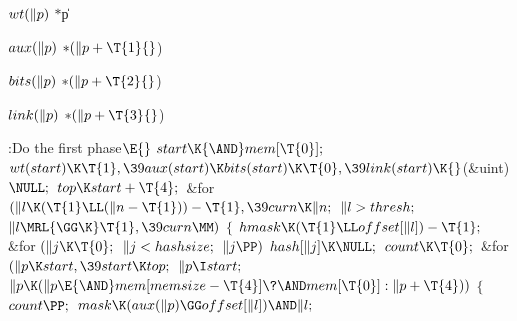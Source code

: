 \Y\B\4\D$\\{wt}(\|p)$ \5
${*}{}$\|p\par
\B\4\D$\\{aux}(\|p)$ \5
${*}(\|p+\T{1}{}$)\par
\B\4\D$\\{bits}(\|p)$ \5
${*}(\|p+\T{2}{}$)\par
\B\4\D$\\{link}(\|p)$ \5
${*}(\|p+\T{3}{}$)\par
\Y\B\4:Do the first phase\X${}\E{}$\6
$\\{start}\K{\AND}\\{mem}[\T{0}];{}$\6
${}\\{wt}(\\{start})\K\T{1},\39\\{aux}(\\{start})\K\\{bits}(\\{start})\K\T{0},%
\39\\{link}(\\{start})\K{}$(\&{uint}) ${}\NULL;{}$\6
${}\\{top}\K\\{start}+\T{4};{}$\6
\&{for} ${}(\|l\K(\T{1}\LL(\|n-\T{1}))-\T{1},\39\\{curn}\K\|n;{}$ ${}\|l>%
\\{thresh};{}$ ${}\|l\MRL{{\GG}{\K}}\T{1},\39\\{curn}\MM){}$\5
${}\{{}$\1\6
${}\\{hmask}\K(\T{1}\LL\\{offset}[\|l])-\T{1};{}$\6
\&{for} ${}(\|j\K\T{0};{}$ ${}\|j<\\{hashsize};{}$ ${}\|j\PP){}$\1\5
${}\\{hash}[\|j]\K\NULL;{}$\2\6
${}\\{count}\K\T{0};{}$\6
\&{for} ${}(\|p\K\\{start},\39\\{start}\K\\{top};{}$ ${}\|p\I\\{start};{}$ ${}%
\|p\K(\|p\E{\AND}\\{mem}[\\{memsize}-\T{4}]\?{\AND}\\{mem}[\T{0}]:\|p+%
\T{4})){}$\5
${}\{{}$\1\6
${}\\{count}\PP;{}$\6
${}\\{mask}\K(\\{aux}(\|p)\GG\\{offset}[\|l])\AND\|l;{}$\6
